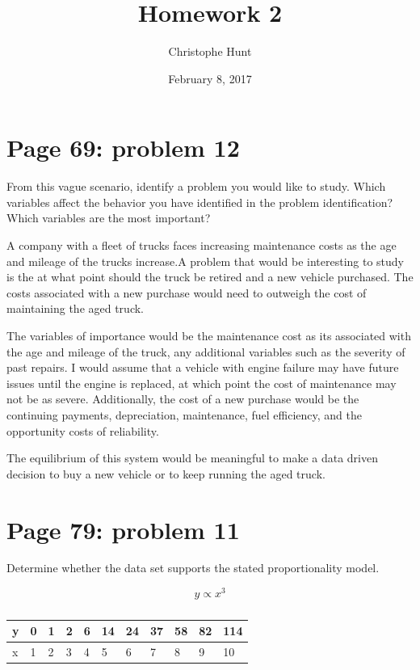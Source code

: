\documentclass[]{article}
\title{Homework 2}
\author{Christophe Hunt}
\date{February 8, 2017}
\begin{document}
\maketitle

{
\setcounter{tocdepth}{2}
\tableofcontents
}
\section{Page 69: problem 12}\label{page-69-problem-12}

From this vague scenario, identify a problem you would like to study.
Which variables affect the behavior you have identified in the problem
identification? Which variables are the most important?

A company with a fleet of trucks faces increasing maintenance costs as
the age and mileage of the trucks increase.A problem that would be
interesting to study is the at what point should the truck be retired
and a new vehicle purchased. The costs associated with a new purchase
would need to outweigh the cost of maintaining the aged truck.

The variables of importance would be the maintenance cost as its
associated with the age and mileage of the truck, any additional
variables such as the severity of past repairs. I would assume that a
vehicle with engine failure may have future issues until the engine is
replaced, at which point the cost of maintenance may not be as severe.
Additionally, the cost of a new purchase would be the continuing
payments, depreciation, maintenance, fuel efficiency, and the
opportunity costs of reliability.

The equilibrium of this system would be meaningful to make a data driven
decision to buy a new vehicle or to keep running the aged truck.

\newpage

\section{Page 79: problem 11}\label{page-79-problem-11}

Determine whether the data set supports the stated proportionality
model.

\[y \propto x^3\]

\begin{table}[!htbp]
\centering
\caption{}
\label{my-label}
\begin{tabular}{l|llllllllll}
y & 0 & 1 & 2 & 6 & 14 & 24 & 37 & 58 & 82 & 114 \\ \hline
x & 1 & 2 & 3 & 4 & 5 & 6 & 7 & 8 & 9 & 10
\end{tabular}
\end{table}
\end{document}
